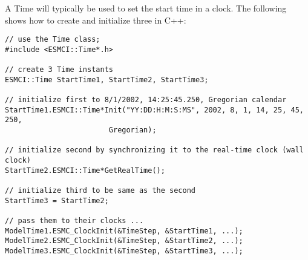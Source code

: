 
A Time will typically be used to set the start time in a
clock.  The following shows how to create and initialize three in C++:

\begin{verbatim}
// use the Time class;
#include <ESMCI::Time*.h>

// create 3 Time instants
ESMCI::Time StartTime1, StartTime2, StartTime3;

// initialize first to 8/1/2002, 14:25:45.250, Gregorian calendar
StartTime1.ESMCI::Time*Init("YY:DD:H:M:S:MS", 2002, 8, 1, 14, 25, 45, 250,
                        Gregorian);

// initialize second by synchronizing it to the real-time clock (wall clock)
StartTime2.ESMCI::Time*GetRealTime();

// initialize third to be same as the second
StartTime3 = StartTime2;

// pass them to their clocks ...
ModelTime1.ESMC_ClockInit(&TimeStep, &StartTime1, ...);
ModelTime2.ESMC_ClockInit(&TimeStep, &StartTime2, ...);
ModelTime3.ESMC_ClockInit(&TimeStep, &StartTime3, ...);
\end{verbatim}
